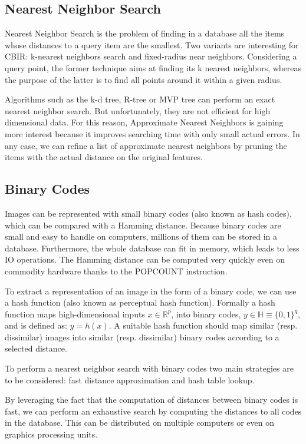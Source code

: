 \subsection{Nearest Neighbor Search}
Nearest Neighbor Search is the problem of finding in a database all the items whose distances to a query item are the smallest. Two variants are interesting for CBIR: k-nearest neighbors search and fixed-radius near neighbors. Considering a query point, the former technique aims at finding its k nearest neighbors, whereas the purpose of the latter is to find all points around it within a given radius.

Algorithms such as the k-d tree, R-tree or MVP tree can perform an exact nearest neighbor search. But unfortunately, they are not efficient for high dimensional data. For this reason, Approximate Nearest Neighbors is gaining more interest because it improves searching time with only small actual errors. In any case, we can refine a list of approximate nearest neighbors by pruning the items with the actual distance on the original features.

\subsection{Binary Codes}
Images can be represented with small binary codes (also known as hash codes), which can be compared with a Hamming distance. Because binary codes are small and easy to handle on computers, millions of them can be stored in a database. Furthermore, the whole database can fit in memory, which leads to less IO operations. The Hamming distance can be computed very quickly even on commodity hardware thanks to the POPCOUNT instruction.

To extract a representation of an image in the form of a binary code, we can use a hash function (also known as perceptual hash function). Formally a hash function maps high-dimensional inputs $x\in\mathbb{R}^{p}$, into binary codes, $y\in\mathbb{H}\equiv\{0, 1\}^{q}$, and is defined as: $y=h(x)$. A suitable hash function should map similar (resp. dissimilar) images into similar (resp. dissimilar) binary codes according to a selected distance.

To perform a nearest neighbor search with binary codes two main strategies are to be considered: fast distance approximation and hash table lookup.

By leveraging the fact that the computation of distances between binary codes is fast, we can perform an exhaustive search by computing the distances to all codes in the database. This can be distributed on multiple computers or even on graphics processing units.


